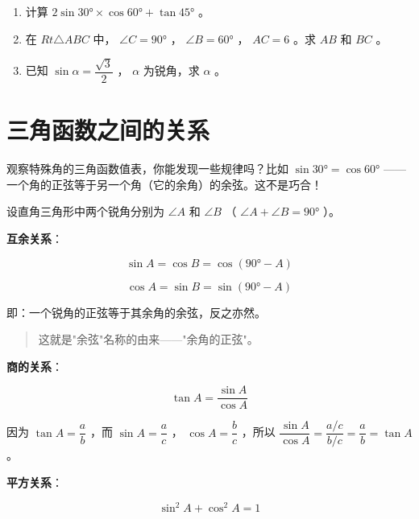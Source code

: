 \begin{practice}


\begin{enumerate}
  \item 计算 $2\sin 30° \times \cos 60° + \tan 45°$ 。
  \item 在 $Rt\triangle ABC$ 中， $\angle C = 90°$ ， $\angle B = 60°$ ， $AC = 6$ 。求 $AB$ 和 $BC$ 。
  \item 已知 $\sin \alpha = \dfrac{\sqrt{3}}{2}$ ， $\alpha$ 为锐角，求 $\alpha$ 。
\end{enumerate}


\end{practice}



\section*{三角函数之间的关系}


\begin{explore}


观察特殊角的三角函数值表，你能发现一些规律吗？比如 $\sin 30° = \cos 60°$ ——一个角的正弦等于另一个角（它的余角）的余弦。这不是巧合！

\end{explore}

\begin{understand}


设直角三角形中两个锐角分别为 $\angle A$ 和 $\angle B$ （ $\angle A + \angle B = 90°$ ）。

\textbf{互余关系}：

\[
\sin A = \cos B = \cos(90° - A)
\]


\[
\cos A = \sin B = \sin(90° - A)
\]


即：一个锐角的正弦等于其余角的余弦，反之亦然。

\end{understand}

\begin{quote}
这就是"余弦"名称的由来——"余角的正弦"。
\end{quote}


\textbf{商的关系}：

\[
\tan A = \frac{\sin A}{\cos A}
\]


因为 $\tan A = \dfrac{a}{b}$ ，而 $\sin A = \dfrac{a}{c}$ ， $\cos A = \dfrac{b}{c}$ ，所以 $\dfrac{\sin A}{\cos A} = \dfrac{a/c}{b/c} = \dfrac{a}{b} = \tan A$ 。

\textbf{平方关系}：

\[
\sin^2 A + \cos^2 A = 1
\]


